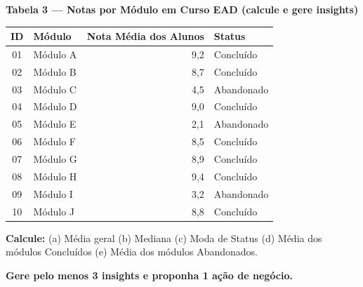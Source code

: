 \begin{BoardBox}
\textbf{Tabela 3 — Notas por Módulo em Curso EAD (calcule e gere insights)}

\medskip
\begin{tabular}{|c|l|r|l|}
\hline
\textbf{ID} & \textbf{Módulo} & \textbf{Nota Média dos Alunos} & \textbf{Status} \\
\hline
01 & Módulo A &  9,2 & Concluído  \\
02 & Módulo B &  8,7 & Concluído  \\
03 & Módulo C &  4,5 & Abandonado \\
04 & Módulo D &  9,0 & Concluído  \\
05 & Módulo E &  2,1 & Abandonado \\
06 & Módulo F &  8,5 & Concluído  \\
07 & Módulo G &  8,9 & Concluído  \\
08 & Módulo H &  9,4 & Concluído  \\
09 & Módulo I &  3,2 & Abandonado \\
10 & Módulo J &  8,8 & Concluído  \\
\hline
\end{tabular}

\smallskip
\textbf{Calcule:}
(a) Média geral \quad
(b) Mediana \quad
(c) Moda de Status \quad
(d) Média dos módulos Concluídos \quad
(e) Média dos módulos Abandonados.

\smallskip
\textbf{Gere pelo menos 3 insights e proponha 1 ação de negócio.}


\end{BoardBox}
